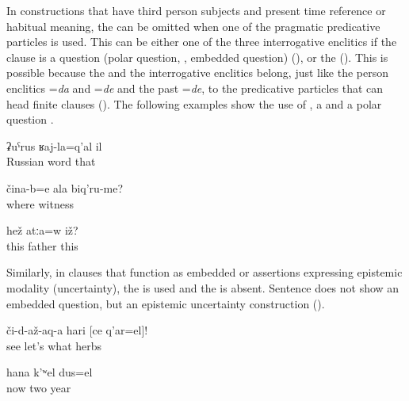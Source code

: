 In  constructions that have third person subjects and present time reference or habitual meaning, the  can be omitted when one of the pragmatic predicative particles is used. This can be either one of the three interrogative enclitics if the  clause is a question (polar question, , embedded question) (), or the   (). This is possible because the  and the interrogative enclitics belong, just like the person enclitics =\textit{da} and =\textit{de} and the past  =\textit{de}, to the predicative particles that can head finite clauses (). The following examples show the use of  , a   and a polar question .

\begin{exe}
	\ex	\label{ex:‎That is a Russian word}
	\gll	ʡuˁrus	ʁaj-la=q'al	il\\
		Russian	word	that	\\
	\glt	{}

	\ex	\label{ex:Where are your witnesses}
	\gll	čina-b=e	ala	biq'ru-me?\\
		where		witness\\
	\glt	{}

	\ex	\label{ex:Is this the father}
	\gll	hež	atːa=w	iž?\\
		this	father	this\\
	\glt	{}
\end{exe}

Similarly, in  clauses that function as embedded  or assertions expressing epistemic modality (uncertainty), the  is used  and the  is absent. Sentence  does not show an embedded question, but an epistemic uncertainty construction ().

\begin{exe}
	\ex	\label{ex:‎Show what herbs these are}
	\gll	či-d-až-aq-a	hari	[ce	q'ar=el]!\\
		see	let's	what	herbs\\
	\glt	{}

	\ex	\label{ex:Now it is probably two years (that have passed by)}
	\gll	hana	k'ʷel	dus=el\\
		now	two	year\\
	\glt	{}
\end{exe}

